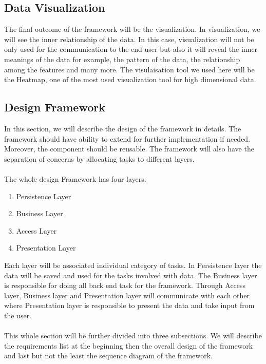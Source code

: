 \subsection{Data Visualization}
The final outcome of the framework will be the visualization. In visualization, we will see the inner relationship of the data. In this case, visualization will not be only used for the communication to the end user but also it will reveal the inner meanings of the data for example, the pattern of the data, the relationship among the features and many more. The visulaisation tool we used here will be the Heatmap, one of the most used visualization tool for high dimensional data.

\subsection{Design Framework}
In this section, we will describe the design of the framework in details. The framework should have ability to  extend for further implementation if needed. Moreover, the component should be reusable. The framework will also have the separation of concerns by allocating tasks to different layers.\\\\
The whole design Framework has four layers: 
\begin{enumerate}
	\item Persistence Layer
	\item Business Layer
	\item Access Layer
	\item Presentation Layer
\end{enumerate}
Each layer will be associated individual category of tasks. In Persistence layer the data will be saved and used for the tasks involved with data. The Business layer is responsible for doing all back end task for the framework. Through Access layer, Business layer and Presentation layer will communicate with each other where Presentation layer is responsible to present the data and take input from the user.\\\\   
This whole section will be further divided into three subsections. We will describe the requirements list at the beginning then the overall design of the framework and last but not the least the sequence diagram of the framework.
